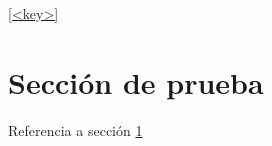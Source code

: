 \documentclass{article}
\begin{document}
\label{<key>}
\ref{<key>}

\section{Sección de prueba}\label{sec:prueba}
Referencia a sección \ref{sec:prueba}
\end{document}
